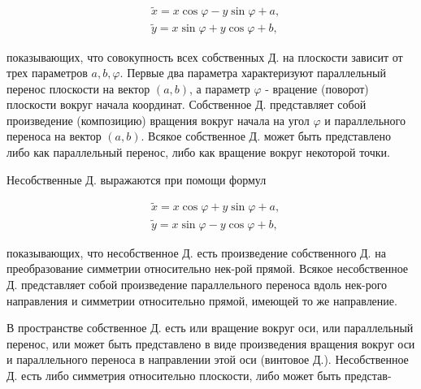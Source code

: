 \documentclass[10pt]{article}
\begin{document}
\[

\begin{aligned}

& \tilde{x}=x \cos \varphi-y \sin \varphi+a, \\

& \tilde{y}=x \sin \varphi+y \cos \varphi+b,

\end{aligned}

\]



показывающих, что совокупность всех собственных Д. на плоскости зависит от трех параметров $a, b, \varphi$. Первые два параметра характеризуют параллельный перенос плоскости на вектор $(a, b)$, а параметр $\varphi$ - врацение (поворот) плоскости вокруг начала координат. Собственное Д. представляет собой произведение (композицию) вращения вокруг начала на угол $\varphi$ и параллельного переноса на вектор $(a, b)$. Всякое собственное Д. может быть представлено либо как параллельный перенос, либо как вращение вокруг некоторой точки.



Несобственные Д. выражаются при помощи формул



\[

\begin{aligned}

& \tilde{x}=x \cos \varphi+y \sin \varphi+a, \\

& \tilde{y}=x \sin \varphi-y \cos \varphi+b,

\end{aligned}

\]



показывающих, что несобственное Д. есть произведение собственного Д. на преобразование симметрии относительно нек-рой прямой. Всякое несобственное Д. представляет собой произведение параллельного переноса вдоль нек-рого направления и симметрии относительно прямой, имеющей то же направление.



В пространстве собственное Д. есть или вращение вокруг оси, или параллельный перенос, или может быть представлено в виде произведения вращения вокруг оси и параллельного переноса в направлении этой оси (винтовое Д.). Несобственное Д. есть либо симметрия относительно плоскости, либо может быть представ-
\end{document}
